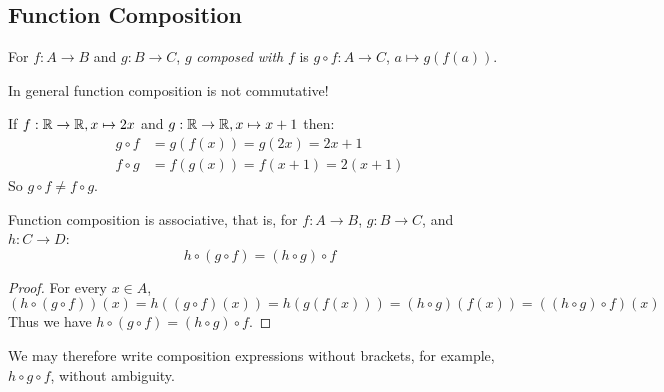 \documentclass[../main.tex]{subfiles}
\begin{document}
\subsection{Function Composition}
\begin{definition}
  For $f: A \to B$ and $g: B \to C$, $g$ \textit{composed with} $f$ is $g \circ f: A \to C$, $a \mapsto g(f(a))$.
\end{definition}
\begin{remark}[Warning]
  In general function composition is not commutative!
\end{remark}
\begin{example}
  If $f: \mathbb{R} \to \mathbb{R}, x \mapsto 2x$ and $g: \mathbb{R} \to \mathbb{R}, x \mapsto x + 1$ then:
  \begin{align*}
    g \circ f &= g(f(x)) = g(2x) = 2x + 1 \\
    f \circ g &= f(g(x)) = f(x + 1) = 2(x+1)
  \end{align*}
  So $g \circ f \neq f \circ g$.
\end{example}
\begin{proposition}
Function composition is associative, that is, for $f: A \to B$, $g: B \to C$, and $h: C \to D$:
\[
  h \circ (g \circ f) = (h \circ g) \circ f
\]
\end{proposition}
\begin{proof}
  For every $x \in A$,
  \[
    (h \circ (g \circ f))(x) = h((g \circ f)(x)) = h(g(f(x))) = (h \circ g)(f(x)) = ((h \circ g) \circ f)(x)
  \]
  Thus we have $h \circ (g \circ f) = (h \circ g) \circ f$.
\end{proof}
We may therefore write composition expressions without brackets, for example, $h \circ g \circ f$, without ambiguity.
\end{document}
